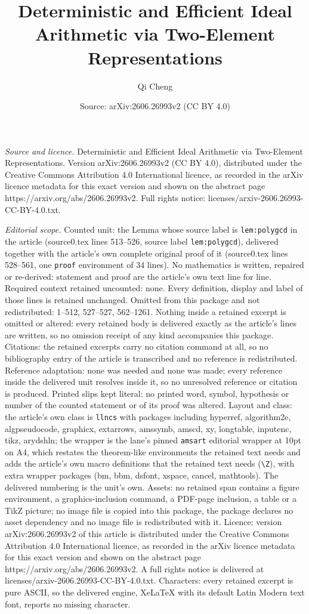\documentclass[10pt,a4paper]{amsart}
\title[Deterministic and Efficient Ideal Arithmetic via Two-Element]{Deterministic and Efficient Ideal Arithmetic via Two-Element Representations}
\author{Qi Cheng}
\date{Source: arXiv:2606.26993v2 (CC BY 4.0)}
\begin{document}
\maketitle

\noindent\emph{Source and licence.} Deterministic and Efficient Ideal Arithmetic via Two-Element Representations. Version arXiv:2606.26993v2 (CC BY 4.0), distributed under the Creative Commons Attribution 4.0 International licence, as recorded in the arXiv licence metadata for this exact version and shown on the abstract page https://arxiv.org/abs/2606.26993v2. Full rights notice: licenses/arxiv-2606.26993-CC-BY-4.0.txt.\par\smallskip

\noindent\textit{Editorial scope.} Counted unit: the Lemma whose source label is \texttt{lem:polygcd} in the article (source0.tex lines 513--526, source label \texttt{lem:polygcd}), delivered together with the article's own complete original proof of it (source0.tex lines 528--561, one \texttt{proof} environment of 34 lines). No mathematics is written, repaired or re-derived: statement and proof are the article's own text line for line. Required context retained uncounted: none. Every definition, display and label of those lines is retained unchanged. Omitted from this package and not redistributed: 1--512, 527--527, 562--1261. Nothing inside a retained excerpt is omitted or altered: every retained body is delivered exactly as the article's lines are written, so no omission receipt of any kind accompanies this package. Citations: the retained excerpts carry no citation command at all, so no bibliography entry of the article is transcribed and no reference is redistributed. Reference adaptation: none was needed and none was made; every reference inside the delivered unit resolves inside it, so no unresolved reference or citation is produced. Printed slips kept literal: no printed word, symbol, hypothesis or number of the counted statement or of its proof was altered. Layout and class: the article's own class is \texttt{llncs} with packages including hyperref, algorithm2e, algpseudocode, graphicx, extarrows, amssymb, amscd, xy, longtable, inputenc, tikz, arydshln; the wrapper is the lane's pinned \texttt{amsart} editorial wrapper at 10pt on A4, which restates the theorem-like environments the retained text needs and adds the article's own macro definitions that the retained text needs (\texttt{\textbackslash Z}), with extra wrapper packages (bm, bbm, dsfont, xspace, cancel, mathtools). The delivered numbering is the unit's own. Assets: no retained span contains a figure environment, a graphics-inclusion command, a PDF-page inclusion, a table or a TikZ picture; no image file is copied into this package, the package declares no asset dependency and no image file is redistributed with it. Licence: version arXiv:2606.26993v2 of this article is distributed under the Creative Commons Attribution 4.0 International licence, as recorded in the arXiv licence metadata for this exact version and shown on the abstract page https://arxiv.org/abs/2606.26993v2. A full rights notice is delivered at licenses/arxiv-2606.26993-CC-BY-4.0.txt. Characters: every retained excerpt is pure ASCII, so the delivered engine, XeLaTeX with its default Latin Modern text font, reports no missing character.
\end{document}
